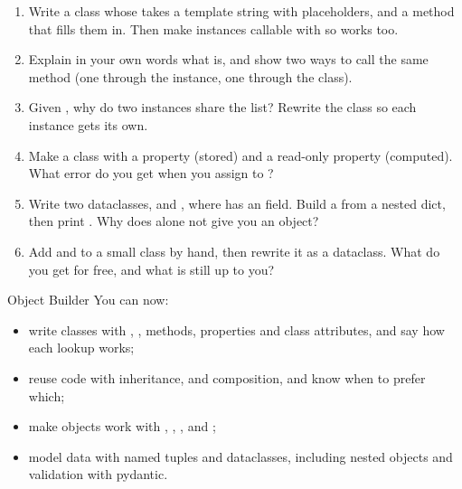 \begin{practice}
\begin{enumerate}[leftmargin=*,itemsep=2pt]
\item Write a class  whose  takes a template string with
   placeholders, and a method  that fills them in. Then make
  instances callable with  so  works too.
\item Explain in your own words what  is, and show two ways to call the same method
  (one through the instance, one through the class).
\item Given , why do two instances share the list? Rewrite the class so each
  instance gets its own.
\item Make a  class with a property  (stored) and a read-only
  property  (computed). What error do you get when you assign to
  ?
\item Write two dataclasses,  and , where  has an 
  field. Build a  from a nested dict, then print . Why does
   alone not give you an  object?
\item Add  and  to a small class by hand, then rewrite it as a dataclass.
  What do you get for free, and what is still up to you?
\end{enumerate}
\end{practice}

\begin{achievement}{Object Builder}
You can now:
\begin{itemize}[leftmargin=*,itemsep=1pt]
\item write classes with , , methods, properties and class attributes,
  and say how each lookup works;
\item reuse code with inheritance,  and composition, and know when to prefer which;
\item make objects work with \code{==}, , , \code{[]} and \code{()};
\item model data with named tuples and dataclasses, including nested objects and validation with
  pydantic.
\end{itemize}
\end{achievement}

